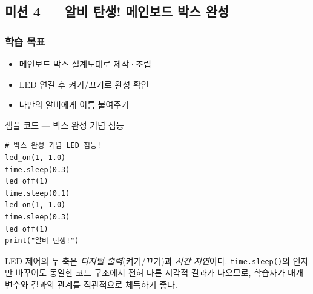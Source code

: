 \subsection{미션 4 --- 알비 탄생! 메인보드 박스 완성}
\label{subsec:ch02-m4}

\begin{storybox}
\end{storybox}

\subsubsection*{학습 목표}
\begin{itemize}[leftmargin=1.4em]
  \item 메인보드 박스 설계도대로 제작·조립
  \item LED 연결 후 켜기/끄기로 완성 확인
  \item 나만의 알비에게 이름 붙여주기
\end{itemize}

\begin{labbox}{샘플 코드 --- 박스 완성 기념 점등}
\begin{verbatim}
# 박스 완성 기념 LED 점등!
led_on(1, 1.0)
time.sleep(0.3)
led_off(1)
time.sleep(0.1)
led_on(1, 1.0)
time.sleep(0.3)
led_off(1)
print("알비 탄생!")
\end{verbatim}
\end{labbox}

\begin{keypoint}
LED 제어의 두 축은 \emph{디지털 출력}(켜기/끄기)과 \emph{시간 지연}이다.
\texttt{time.sleep()}의 인자만 바꾸어도 동일한 코드 구조에서 전혀 다른
시각적 결과가 나오므로, 학습자가 매개변수와 결과의 관계를 직관적으로
체득하기 좋다.
\end{keypoint}
